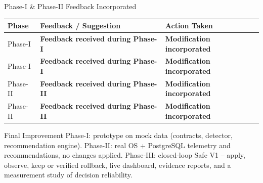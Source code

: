 \documentclass[aspectratio=169,11pt]{beamer}
\newcommand{\fillme}[1]{\textbf{\color{red}#1}}
\begin{document}
\begin{frame}{Phase-I \& Phase-II Feedback Incorporated}

\scriptsize

\begin{center}

\renewcommand{\arraystretch}{1.35}

\begin{tabularx}{.96\textwidth}
{@{}p{2.1cm}X X@{}}

\toprule
\textbf{Phase} &
\textbf{Feedback / Suggestion} &
\textbf{Action Taken}\\
\midrule

Phase-I &
\fillme{Feedback received during Phase-I} &
\fillme{Modification incorporated}\\

Phase-I &
\fillme{Feedback received during Phase-I} &
\fillme{Modification incorporated}\\

Phase-II &
\fillme{Feedback received during Phase-II} &
\fillme{Modification incorporated}\\

Phase-II &
\fillme{Feedback received during Phase-II} &
\fillme{Modification incorporated}\\

\bottomrule

\end{tabularx}

\end{center}

\vfill

\begin{block}{Final Improvement}
\small
Phase-I: prototype on mock data (contracts, detector, recommendation engine).
Phase-II: real OS + PostgreSQL telemetry and recommendations, no changes applied.
Phase-III: closed-loop Safe V1 -- apply, observe, keep or verified rollback,
live dashboard, evidence reports, and a measurement study of decision reliability.
\end{block}

\end{frame}
\end{document}

